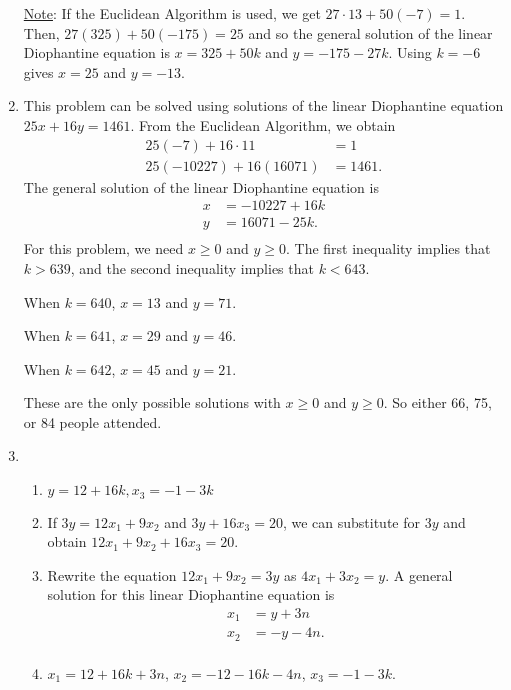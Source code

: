 \begin{enumerate}
\underline{Note}:  If the Euclidean Algorithm is used, we get $27 \cdot 13 + 50 \left( -7 \right) = 1$.  Then, 
$27 \left( 325 \right) + 50 \left( -175 \right) = 25$ and so the general solution of the linear Diophantine equation is $x = 325 + 50k$ and $y = -175 - 27k$.  Using $k = -6$ gives $x = 25$ and 
$y = -13$.

\item This problem can be solved using solutions of the linear Diophantine equation 
$25x + 16y = 1461$.  From the Euclidean Algorithm, we obtain
\[
\begin{aligned}
25 \left( -7 \right) + 16 \cdot 11 &= 1 \\
25 \left( -10227 \right) + 16 \left( 16071 \right) &= 1461. 
\end{aligned}
\]
The general solution of the linear Diophantine equation is
\[
\begin{aligned}
x &= -10227 + 16k \\
y &= 16071 - 25k. \\
\end{aligned}
\]
For this problem, we need $x \geq 0$ and $y \geq 0$.  The first inequality implies that 
$k > 639$, and the second inequality implies that $k < 643$.

\begin{multicols}{2}
When $k = 640$, $x = 13$ and $y = 71$.

When $k = 641$, $x = 29$ and $y = 46$.

When $k = 642$, $x = 45$ and $y = 21$.
\end{multicols}

These are the only possible solutions with $x \geq 0$ and $y \geq 0$.  So either 66, 75, or 84 people attended.

\item \begin{enumerate}
\item $y = 12 + 16k, x_3 = -1 - 3k$

\item If $3y = 12x_1 + 9x_2$ and $3y + 16x_3 = 20$, we can substitute for $3y$ and obtain 
$12x_1 + 9x_2 + 16x_3 = 20$.

\item Rewrite the equation $12x_1 + 9x_2 = 3y$ as $4x_1 + 3x_2 = y$.  A general solution for this linear Diophantine equation is
\[
\begin{aligned}
x_1 &= y + 3n \\
x_2 &= -y - 4n. \\
\end{aligned}
\]
\item $x_1 = 12 + 16k + 3n$, $x_2 = -12 - 16k - 4n$, $x_3 = -1 - 3k$.


\end{enumerate}
\end{enumerate}
